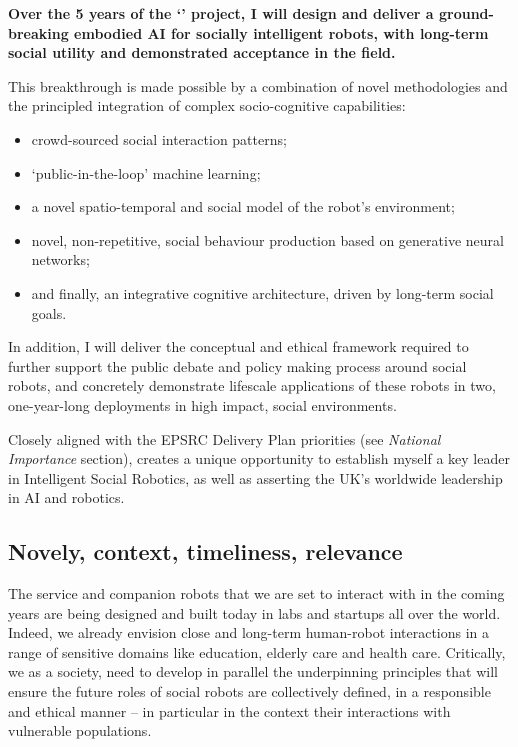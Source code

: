 \begin{framed}

\noindent\bf Over the 5 years of the `\project' project, I will design and
deliver a ground-breaking embodied AI for socially intelligent robots, with
long-term social utility and demonstrated acceptance in the field.

\vspace{0.3em}
\noindent This breakthrough is made possible by a combination of novel methodologies and
the principled integration of complex socio-cognitive capabilities:

\begin{itemize}
        \item crowd-sourced social interaction patterns;
        \item `public-in-the-loop' machine learning;
        \item a novel spatio-temporal and social model of the robot's environment;
        \item novel, non-repetitive, social behaviour production based on
            generative neural networks;
        \item and finally, an integrative cognitive architecture, driven by
            long-term social goals.
\end{itemize}

\vspace{0.3em}
\noindent In addition, I will deliver the conceptual and ethical framework required to
further support the public debate and policy making process around social
robots, and concretely demonstrate lifescale applications of these robots in
two, one-year-long deployments in high impact, social environments.

Closely aligned with the EPSRC Delivery Plan priorities (see \emph{National
Importance} section), \project creates a unique opportunity to establish
myself a key leader in Intelligent Social Robotics, as well as asserting the
UK's worldwide leadership in AI and robotics.

\end{framed}

\subsection{Novely, context, timeliness, relevance}

The service and companion robots that we are set to interact with in the coming
years are being designed and built today in labs and startups all over the
world. Indeed, we already envision close and long-term human-robot interactions
in a range of sensitive domains like education, elderly care and health care.
Critically, we as a society, need to develop in parallel the underpinning
principles that will ensure the future roles of social robots are collectively
defined, in a responsible and ethical manner -- in particular in the context
their interactions with vulnerable populations.

